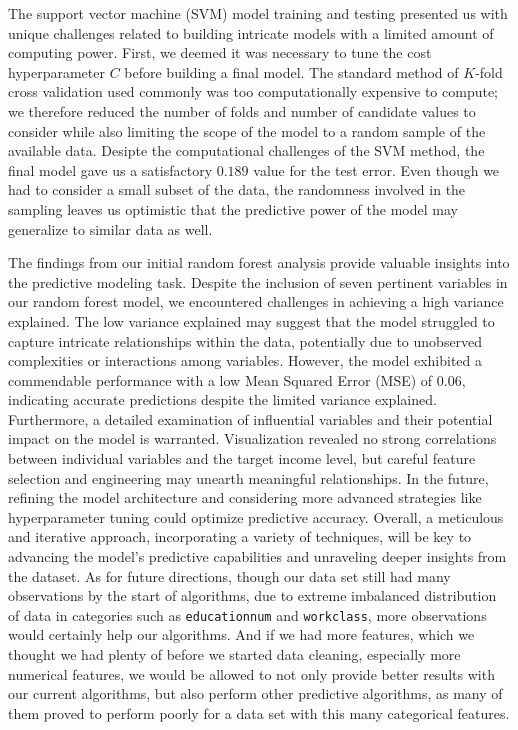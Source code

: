 \documentclass{article}
\begin{document}
	The support vector machine (SVM) model training and testing presented us with unique challenges related to building intricate models with a limited amount of computing power. First, we deemed it was necessary to tune the cost hyperparameter $C$ before building a final model. The standard method of $K$-fold cross validation used commonly was too computationally expensive to compute; we therefore reduced the number of folds and number of candidate values to consider while also limiting the scope of the model to a random sample of the available data. Desipte the computational challenges of the SVM method, the final model gave us a satisfactory $0.189$ value for the test error. Even though we had to consider a small subset of the data, the randomness involved in the sampling leaves us optimistic that the predictive power of the model may generalize to similar data as well. 
	
    The findings from our initial random forest analysis provide valuable insights into the predictive modeling task. Despite the inclusion of seven pertinent variables in our random forest model, we encountered challenges in achieving a high variance explained. The low variance explained may suggest that the model struggled to capture intricate relationships within the data, potentially due to unobserved complexities or interactions among variables. However, the model exhibited a commendable performance with a low Mean Squared Error (MSE) of 0.06, indicating accurate predictions despite the limited variance explained.
    Furthermore, a detailed examination of influential variables and their potential impact on the model is warranted. Visualization revealed no strong correlations between individual variables and the target income level, but careful feature selection and engineering may unearth meaningful relationships. In the future, refining the model architecture and considering more advanced strategies like hyperparameter tuning could optimize predictive accuracy. Overall, a meticulous and iterative approach, incorporating a variety of techniques, will be key to advancing the model's predictive capabilities and unraveling deeper insights from the dataset.
    As for future directions, though our data set still had many observations by the start of algorithms, due to extreme imbalanced distribution of data in categories such as \texttt{educationnum} and \texttt{workclass}, more observations would certainly help our algorithms. And if we had more features, which we thought we had plenty of before we started data cleaning, especially more numerical features, we would be allowed to not only provide better results with our current algorithms, but also perform other predictive algorithms, as many of them proved to perform poorly for a data set with this many categorical features. 
\end{document}

